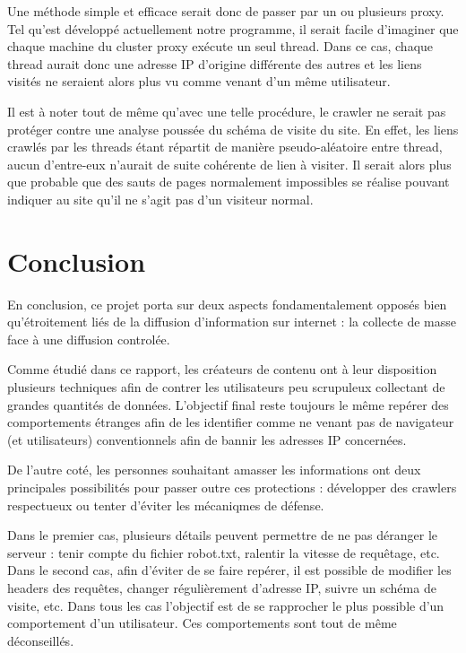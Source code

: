 \documentclass[hideweeklyreports,noposter]{polytech/polytech}
\begin{document}
	    Une méthode simple et efficace serait donc de passer par un ou plusieurs proxy.
	    Tel qu'est développé actuellement notre programme, il serait facile d'imaginer que chaque machine du cluster proxy exécute un seul thread.
	    Dans ce cas, chaque thread aurait donc une adresse IP d'origine différente des autres et les liens visités ne seraient alors plus vu comme venant d'un même utilisateur.
	    
	    
	    Il est à noter tout de même qu'avec une telle procédure, le crawler ne serait pas protéger contre une analyse poussée du schéma de visite du site.
	    En effet, les liens crawlés par les threads étant répartit de manière pseudo-aléatoire entre thread, aucun d'entre-eux n'aurait de suite cohérente de lien à visiter.
	    Il serait alors plus que probable que des sauts de pages normalement impossibles se réalise pouvant indiquer au site qu'il ne s'agit pas d'un visiteur normal.
		

\part{Conclusion}

    En conclusion, ce projet porta sur deux aspects fondamentalement opposés bien qu'étroitement liés de la diffusion d'information sur internet : la collecte de masse face à une diffusion controlée.
    
    Comme étudié dans ce rapport, les créateurs de contenu ont à leur disposition plusieurs techniques afin de contrer les utilisateurs peu scrupuleux collectant de grandes quantités de données.
    L'objectif final reste toujours le même repérer des comportements étranges afin de les identifier comme ne venant pas de navigateur (et utilisateurs) conventionnels afin de bannir les adresses IP concernées.
    
    
    De l'autre coté, les personnes souhaitant amasser les informations ont deux principales possibilités pour passer outre ces protections : développer des crawlers respectueux ou tenter d'éviter les mécaniqmes de défense.
    
    Dans le premier cas, plusieurs détails peuvent permettre de ne pas déranger le serveur : tenir compte du fichier robot.txt, ralentir la vitesse de requêtage, etc.
    Dans le second cas, afin d'éviter de se faire repérer, il est possible de modifier les headers des requêtes, changer régulièrement d'adresse IP, suivre un schéma de visite, etc.
    Dans tous les cas l'objectif est de se rapprocher le plus possible d'un comportement d'un utilisateur.
    Ces comportements sont tout de même déconseillés.

\appendix		
\end{document}
